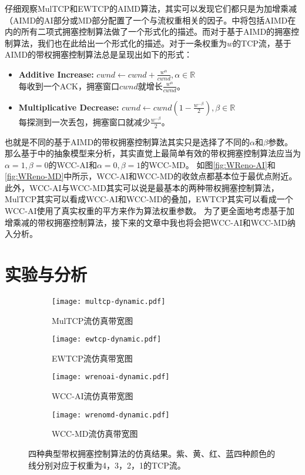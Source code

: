 \documentclass[winfonts]{njuthesis}
\begin{document}
仔细观察MulTCP和EWTCP的AIMD算法，其实可以发现它们都只是为加增乘减（AIMD的AI部分或MD部分配置了一个与流权重相关的因子。\cite{bansal2001binomial}中将包括AIMD在内的所有二项式拥塞控制算法做了一个形式化的描述。而对于基于AIMD的拥塞控制算法，我们也在此给出一个形式化的描述。对于一条权重为$w$的TCP流，基于AIMD的带权拥塞控制算法总是呈现出如下的形式：
\begin{itemize}
  \item {\bf Additive Increase:} $cwnd \leftarrow cwnd + \frac{w^\alpha}{cwnd}, \alpha \in \mathbb{R}$ \\
  每收到一个ACK，拥塞窗口$cwnd$就增长$\frac{w^\alpha}{cwnd}$。
  \item {\bf Multiplicative Decrease:} $cwnd \leftarrow cwnd (1 - \frac{w^{-\beta}}{2}), \beta \in \mathbb{R}$ \\
  每探测到一次丢包，拥塞窗口就减少$\frac{w^{-\beta}}{2}$。
\end{itemize}
也就是不同的基于AIMD的带权拥塞控制算法其实只是选择了不同的$\alpha$和$\beta$参数。
那么基于\cite{chiu1989analysis}中的抽象模型来分析，其实直觉上最简单有效的带权拥塞控制算法应当为$\alpha=1,\beta=0$的WCC-AI和$\alpha=0,\beta=1$的WCC-MD。
如图\ref{fig:WReno-AI}和\ref{fig:WReno-MD}中所示，WCC-AI和WCC-MD的收敛点都基本位于最优点附近。
此外，WCC-AI与WCC-MD其实可以说是最基本的两种带权拥塞控制算法，MulTCP其实可以看成WCC-AI和WCC-MD的叠加，EWTCP其实可以看成一个WCC-AI使用了真实权重的平方来作为算法权重参数。
为了更全面地考虑基于加增乘减的带权拥塞控制算法，接下来的文章中我也将会把WCC-AI和WCC-MD纳入分析。

\chapter{实验与分析}\label{chapter:analysis}

\begin{figure*}[tp]
	\centering
  \begin{subfigure}{.6\textwidth}
    \centering
		\texttt{[image: multcp-dynamic.pdf]}
    \label{fig:MulTCPPerformance}
    \caption{MulTCP流仿真带宽图}
  \end{subfigure}
  \begin{subfigure}{.6\textwidth}
    \centering
		\texttt{[image: ewtcp-dynamic.pdf]}
    \label{fig:EWTCPPerformance}
    \caption{EWTCP流仿真带宽图}
	\end{subfigure}
  \begin{subfigure}{.6\textwidth}
    \centering
		\texttt{[image: wrenoai-dynamic.pdf]}
    \label{fig:WReno-AIPerformance}
    \caption{WCC-AI流仿真带宽图}
  \end{subfigure}
  \begin{subfigure}{.6\textwidth}
    \centering
		\texttt{[image: wrenomd-dynamic.pdf]}
    \label{fig:WReno-AIPerformance}
    \caption{WCC-MD流仿真带宽图}
	\end{subfigure}
	\caption{四种典型带权拥塞控制算法的仿真结果。紫、黄、红、蓝四种颜色的线分别对应于权重为4，3，2，1的TCP流。}
	\label{fig:Performance}
\end{figure*}
\end{document}
